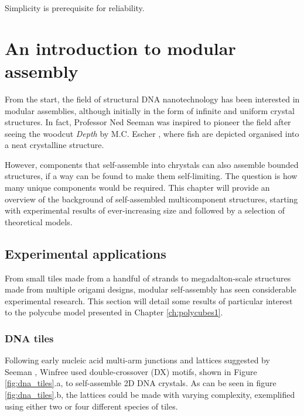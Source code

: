 \begin{savequote}[8cm]
Simplicity is prerequisite for reliability.
\end{savequote}

\chapter{\label{ch:polycubes_intro}An introduction to modular assembly}

\minitoc

From the start, the field of structural DNA nanotechnology has been interested in modular assemblies, although initially in the form of infinite and uniform crystal structures. In fact, Professor Ned Seeman was inspired to pioneer the field after seeing the woodcut \emph{Depth} by M.C. Escher \cite{seeman_2016}, where fish are depicted organised into a neat crystalline structure.

However, components that self-assemble into chrystals can also assemble bounded structures, if a way can be found to make them self-limiting. The question is how many unique components would be required. This chapter will provide an overview of the background of self-assembled multicomponent structures, starting with experimental results of ever-increasing size and followed by a selection of theoretical models.

\section{Experimental applications} \label{sec:experimental_appl}
From small tiles made from a handful of strands to megadalton-scale structures made from multiple origami designs, modular self-assembly has seen considerable experimental research. This section will detail some results of particular interest to the polycube model presented in Chapter \ref{ch:polycubes1}.

\subsection{DNA tiles}
\label{sec:dna_tiles_bricks}
Following early nucleic acid multi-arm junctions and lattices suggested by Seeman \cite{seeman1982nucleic}, Winfree \cite{winfree1998algorithmic, winfree1998design} used double-crossover (DX) motifs, shown in Figure \ref{fig:dna_tiles}.a, to self-assemble 2D DNA crystals. As can be seen in figure \ref{fig:dna_tiles}.b, the lattices could be made with varying complexity, exemplified using either two or four different species of tiles.

